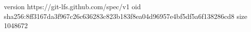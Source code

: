 version https://git-lfs.github.com/spec/v1
oid sha256:8ff3167da3f967c26c636283c823b183f8ea04d96957e4bf5df5a6f138286cd8
size 1048672
